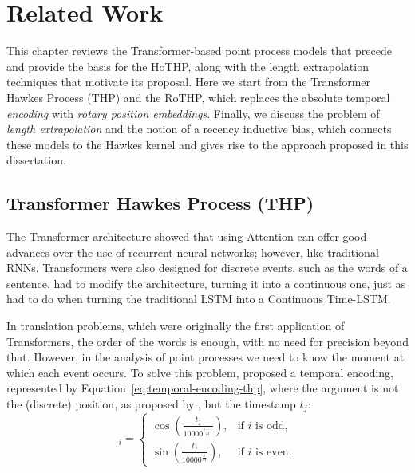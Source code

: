 \chapter{Related Work}
\label{cap:trabalhos-relacionados}

This chapter reviews the Transformer-based point process models that precede and provide the basis for the HoTHP, along with the length extrapolation techniques that motivate its proposal. Here we start from the Transformer Hawkes Process (THP) and the RoTHP, which replaces the absolute temporal \textit{encoding} with \textit{rotary position embeddings}. Finally, we discuss the problem of \textit{length extrapolation} and the notion of a recency inductive bias, which connects these models to the Hawkes kernel and gives rise to the approach proposed in this dissertation.

\section{Transformer Hawkes Process (THP)}\label{sec:thp}

    The Transformer architecture \cite{vaswani_attention_2017} showed that using Attention can offer good advances over the use of recurrent neural networks; however, like traditional RNNs, Transformers were also designed for discrete events, such as the words of a sentence.  had to modify the architecture, turning it into a continuous one, just as  had to do when turning the traditional LSTM into a Continuous Time-LSTM.

    In translation problems, which were originally the first application of Transformers, the order of the words is enough, with no need for precision beyond that. However, in the analysis of point processes we need to know the moment at which each event occurs. To solve this problem,  proposed a temporal encoding, represented by Equation~\eqref{eq:temporal-encoding-thp}, where the argument is not the (discrete) position, as proposed by , but the timestamp $t_j$:
    \begin{equation}
        [z(t_j)]_i =
        \begin{cases}
            \cos \left( \frac{t_j}{10000^{\frac{i-1}{M}}} \right), & \text{if } i \text{ is odd,} \\
            \sin \left( \frac{t_j}{10000^{\frac{i}{M}}} \right), & \text{if } i \text{ is even.}
        \end{cases}
        \label{eq:temporal-encoding-thp}
    \end{equation}

